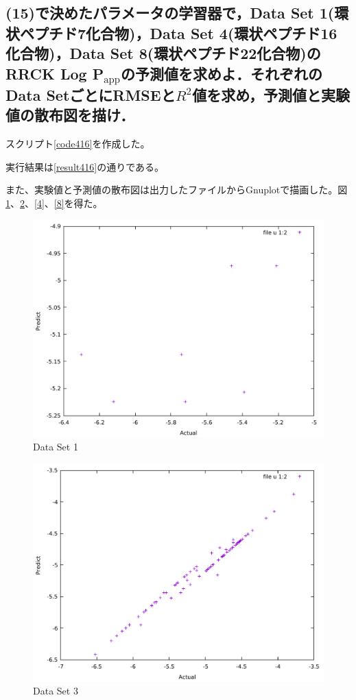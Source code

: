 \documentclass[uplatex,a4j]{jsarticle}
\begin{document}
  \subsection{(15)で決めたパラメータの学習器で，Data Set 1(環状ペプチド7化合物)，Data Set 4(環状ペプチド16化合物)，Data Set 8(環状ペプチド22化合物)のRRCK Log P$_\text{app}$の予測値を求めよ．それぞれのData SetごとにRMSEと$R^2$値を求め，予測値と実験値の散布図を描け．}
  スクリプト\ref{code416}を作成した。
  
  実行結果は\ref{result416}の通りである。
  
  また、実験値と予測値の散布図は出力したファイルからGnuplotで描画した。図\ref{1}、\ref{3}、\ref{4}、\ref{8}を得た。
  \begin{figure}[H]
    \begin{center}
      \includegraphics[width=14cm]{pre1.pdf}
      \caption{Data Set 1}
      \label{1}
    \end{center}
  \end{figure}
  \begin{figure}[H]
    \begin{center}
      \includegraphics[width=14cm]{pre3.pdf}
      \caption{Data Set 3}
      \label{3}
    \end{center}
  \end{figure}
\end{document}
